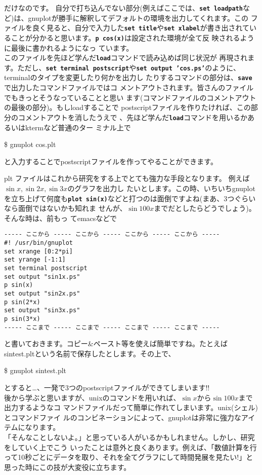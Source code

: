 \documentclass[a4j]{ujarticle} %
\newenvironment{terminal}{%
  \begin{center}
   \begin{minipage}{.8\textwidth}
    \setlength{\FrameSep}{.5\FrameSep}%
    \begin{framed}\ttfamily\small%
     \setlength\baselineskip{.85\baselineskip}%
}{%
    \end{framed}
   \end{minipage}
  \end{center}%
}
\begin{document}
 だけなのです。 自分で打ち込んでない部分(例えばここでは、{\tt \bf set loadpath}な
 ど)は、gnuplotが勝手に解釈してデフォルトの環境を出力してくれます。この
 ファイルを良く見ると、自分で入力した{\tt \bf set title}や{\tt \bf set
 xlabel}が書き出されていることが分かると思います。{\tt \bf p cos(x)}は設定された環境が全て反
 映されるように最後に書かれるようになっ ています。\\
このファイルを先ほど学んだ{\tt\bf load}コマンドで読み込めば同じ状況が
再現されます。ただし、{\tt\bf set terminal postscript}や{\tt\bf set
output 'cos.ps'}のように、terminalのタイプを変更したり何かを出力し
たりするコマンドの部分は、{\tt\bf save}で出力したコマンドファイルではコ
メントアウトされます。皆さんのファイルでもきっとそうなっていることと思い
ます(コマンドファイルのコメントアウトの最後の部分)。もしloadすることで
postscriptファイルを作りたければ、この部分のコメントアウトを消したうえで
、先ほど学んだ{\tt\bf load}コマンドを用いるかあるいはktermなど普通のター
ミナル上で
\begin{terminal}
\$ gnuplot cos.plt
\end{terminal}
と入力することでpostscriptファイルを作ってやることができます。

plt ファイルはこれから研究をする上でとても強力な手段となります。
例えば$\sin{x},\sin{2x},\sin{3x}$のグラフを出力し
たいとします。この時、いちいちgnuplotを立ち上げて何度も{\tt \bf plot
sin(x)}などと打つのは面倒ですよね(まあ、3つぐらいなら面倒ではないかも知れま
せんが、$\sin{100 x}$までだとしたらどうでしょう)。そんな時は、前もっ
てemacsなどで
\begin{verbatim}
----- ここから ----- ここから ----- ここから ----- ここから -----
#! /usr/bin/gnuplot
set xrange [0:2*pi]
set yrange [-1:1]
set terminal postscript
set output "sin1x.ps"
p sin(x)
set output "sin2x.ps"
p sin(2*x)
set output "sin3x.ps"
p sin(3*x)
----- ここまで ----- ここまで ----- ここまで ----- ここまで -----
\end{verbatim}
と書いておきます。コピー\&ペースト等を使えば簡単ですね。たとえば
sintest.pltという名前で保存したとします。その上で、
\begin{terminal}
\$ gnuplot sintest.plt
\end{terminal}
とすると…、一発で3つのpostscriptファイルができてしまいます!!\\
後から学ぶと思いますが、unixのコマンドを用いれば、$\sin{x}$から$\sin{100x}$まで出力するようなコ
マンドファイルだって簡単に作れてしまいます。unix(シェル)とコマンドファイ
ルのコンビネーションによって、gnuplotは非常に強力なアイテムになります。
\\
「そんなことしないよ。」と思っている人がいるかもしれません。しかし、研究をしていく上でこう
いったことは意外と良くあります。例えば、「数値計算を行って10秒ごとにデータを取り、それを全てグラフにして時間発展を見たい!」と
思った時にこの技が大変役に立ちます。\\\\
\end{document}
